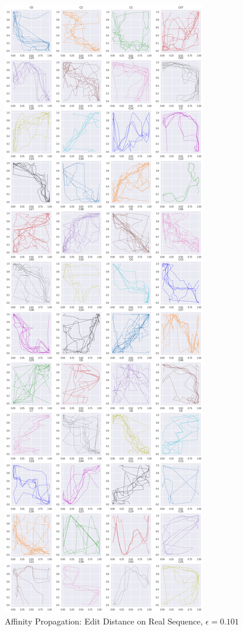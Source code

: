 \begin{figure}[h]
  \centering
  \includegraphics[width=\linewidth,height=\textheight,keepaspectratio]{figs/clusters/CLU_AP_ALL[EDR;e=.101].png}
  \caption{Affinity Propagation: Edit Distance on Real Sequence, $\epsilon=0.101$}
\end{figure}

